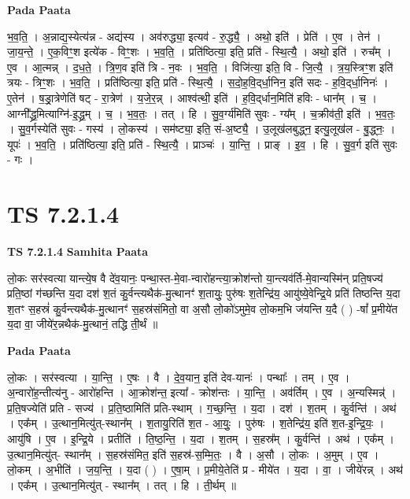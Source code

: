 \documentclass[17pt]{extarticle}
\begin{document}
\textbf{Pada Paata} \newline

भ॒व॒ति॒ । अ॒न्नाद्य॒स्येत्य॑न्न - अद्य॑स्य । अव॑रुद्ध्या॒ इत्यव॑ - रु॒द्ध्यै॒ । अथो॒ इति॑ । प्रेति॑ । ए॒व । तेन॑ । जा॒य॒न्ते॒ । ए॒क॒विꣳ॒॒श इत्ये॑क - विꣳ॒॒शः । भ॒व॒ति॒ । प्रति॑ष्ठित्या॒ इति॒ प्रति॑ - स्थि॒त्यै॒ । अथो॒ इति॑ । रुच᳚म् । ए॒व । आ॒त्मन्न् । द॒ध॒ते॒ । त्रि॒ण॒व इति॑ त्रि - न॒वः । भ॒व॒ति॒ । विजि॑त्या॒ इति॒ वि - जि॒त्यै॒ । त्र॒य॒स्त्रिꣳ॒॒श इति॑ त्रयः - त्रिꣳ॒॒शः । भ॒व॒ति॒ । प्रति॑ष्ठित्या॒ इति॒ प्रति॑ - स्थि॒त्यै॒ । स॒दो॒ह॒वि॒द्‌र्धा॒निन॒ इति॑ सदः - ह॒वि॒द्‌र्धा॒निनः॑ । ए॒तेन॑ । ष॒ड्रा॒त्रेणेति॑ षट् - रा॒त्रेण॑ । य॒जे॒र॒न्न् । आश्व॑त्थी॒ इति॑ । ह॒वि॒द्‌र्धान॒मिति॑ हविः - धान᳚म् । च॒ । आग्नी᳚द्ध्र॒मित्याग्नि॑-इ॒द्ध्र॒म् । च॒ । भ॒व॒तः॒ । तत् । हि । सु॒व॒र्ग्य॑मिति॑ सुवः - ग्य᳚म् । च॒क्रीव॑ती॒ इति॑ । भ॒व॒तः॒ । सु॒व॒र्गस्येति॑ सुवः - गस्य॑ । लो॒कस्य॑ । सम॑ष्ट्या॒ इति॒ सं-अ॒ष्ट्यै॒ । उ॒लूख॑लबुद्ध्न॒ इत्यु॒लूख॑ल - बु॒द्ध्नः॒ । यूपः॑ । भ॒व॒ति॒ । प्रति॑ष्ठित्या॒ इति॒ प्रति॑ - स्थि॒त्यै॒ । प्राञ्चः॑ । या॒न्ति॒ । प्राङ् । इ॒व॒ । हि । सु॒व॒र्ग इति॑ सुवः - गः ।  \newline




\section*{ TS 7.2.1.4 }

\textbf{TS 7.2.1.4 } \newline
\textbf{Samhita Paata} \newline

लो॒कः सर॑स्वत्या यान्त्ये॒ष वै दे॑व॒यानः॒ पन्था॒स्त-मे॒वा-न्वारो॑हन्त्या॒क्रोश॑न्तो या॒न्त्यव॑र्ति-मे॒वान्यस्मि॑न् प्रति॒षज्य॑ प्रति॒ष्ठां ग॑च्छन्ति य॒दा दश॑ श॒तं कु॒र्वन्त्यथैक॑-मु॒त्थानꣳ॑ श॒तायुः॒ पुरु॑षः श॒तेन्द्रि॑य॒ आयु॑ष्ये॒वेन्द्रि॒ये प्रति॑ तिष्ठन्ति य॒दा श॒तꣳ स॒हस्रं॑ कु॒र्वन्त्यथैक॑-मु॒त्थानꣳ॑ स॒हस्र॑संमितो॒ वा अ॒सौ लो॒को॑ऽमुमे॒व लो॒कम॒भि ज॑यन्ति य॒दै ( ) -षां᳚ प्र॒मीये॑त य॒दा वा॒ जीये॑र॒न्नथैक॑-मु॒त्थानं॒ तद्धि ती॒र्थं ॥ \newline

\textbf{Pada Paata} \newline

लो॒कः । सर॑स्वत्या । या॒न्ति॒ । ए॒षः । वै । दे॒व॒यान॒ इति॑ देव-यानः॑ । पन्थाः᳚ । तम् । ए॒व । अ॒न्वारो॑ह॒न्तीत्य॑नु - आरो॑हन्ति । आ॒क्रोश॑न्त॒ इत्या᳚ - क्रोश॑न्तः । या॒न्ति॒ । अव॑र्तिम् । ए॒व । अ॒न्यस्मिन्न्॑ । प्र॒ति॒षज्येति॑ प्रति - सज्य॑ । प्र॒ति॒ष्ठामिति॑ प्रति-स्थाम् । ग॒च्छ॒न्ति॒ । य॒दा । दश॑ । श॒तम् । कु॒र्वन्ति॑ । अथ॑ । एक᳚म् । उ॒त्थान॒मित्यु॑त्-स्थान᳚म् । श॒तायु॒रिति॑ श॒त - आ॒युः॒ । पुरु॑षः । श॒तेन्द्रि॑य॒ इति॑ श॒त-इ॒न्द्रि॒यः॒ । आयु॑षि । ए॒व । इ॒न्द्रि॒ये । प्रतीति॑ । ति॒ष्ठ॒न्ति॒ । य॒दा । श॒तम् । स॒हस्र᳚म् । कु॒र्वन्ति॑ । अथ॑ । एक᳚म् । उ॒त्थान॒मित्यु॑त्- स्थान᳚म् । स॒हस्र॑संमित॒ इति॑ स॒हस्र॑-स॒म्मि॒तः॒ । वै । अ॒सौ । लो॒कः । अ॒मुम् । ए॒व । लो॒कम् । अ॒भीति॑ । ज॒य॒न्ति॒ । य॒दा ( ) । ए॒षा॒म् । प्र॒मीये॒तेति॑ प्र - मीये॑त । य॒दा । वा॒ । जीये॑रन्न् । अथ॑ । एक᳚म् । उ॒त्थान॒मित्यु॑त् - स्थान᳚म् । तत् । हि । ती॒र्थम् ॥  \newline
\end{document}

